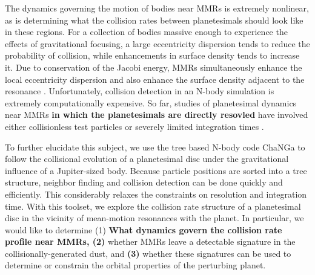 \documentclass[fleqn,usenatbib]{mnras}
\begin{document}
The dynamics governing the motion of bodies near MMRs is extremely nonlinear, as is determining what the collision rates between planetesimals 
should look like in these regions. For a collection of bodies massive enough to experience the effects of gravitational focusing, a large eccentricity 
dispersion tends to reduce the probability of collision, while enhancements in surface density tends to increase it. Due to conservation of the Jacobi 
energy, MMRs simultaneously enhance the local eccentricity dispersion and also enhance the surface density adjacent to the resonance 
\citep{2000Icar..143...45R, 2017ApJ...850..103B}. Unfortunately, collision detection in an N-body simulation is extremely computationally expensive. 
So far, studies of planetesimal dynamics near MMRs \textbf{in which the planetesimals are directly resovled} have involved either collisionless test particles 
\citep{2017ApJ...850..103B, 2016ApJ...818..159T, 2018ApJ...857....3T} or severely limited integration times \citep{2000Icar..143...45R}.

To further elucidate this subject, we use the tree based N-body code {\sc ChaNGa}\citep{2008IEEEpds...ChaNGa, 2015AphCom..2..1}  to follow the 
collisional evolution of a planetesimal disc under the gravitational influence of a Jupiter-sized body. Because particle positions are sorted into a tree 
structure, neighbor finding and collision detection can be done quickly and efficiently. This considerably relaxes the constraints on resolution and 
integration time. With this toolset, we explore the collision rate structure of a planetesimal disc in the vicinity of mean-motion resonances with the planet. In 
particular, we would like to determine (1) \textbf{What dynamics govern the collision rate profile near MMRs, (2)} whether MMRs leave a detectable signature in the collisionally-generated dust, and \textbf{(3)} whether these 
signatures can be used to determine or constrain the orbital properties of the perturbing planet.
\end{document}
